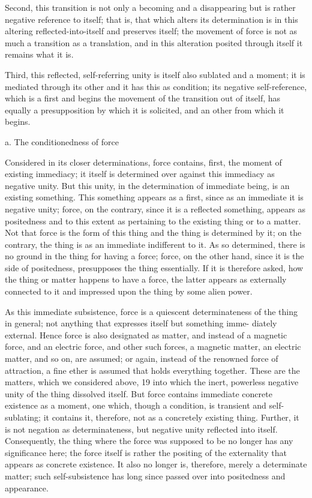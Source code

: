 Second, this transition is not only a becoming and a disappearing
but is rather negative reference to itself;
that is, that which alters its determination is
in this altering reflected-into-itself and preserves itself;
the movement of force is not as much a transition as a translation,
and in this alteration posited through itself it remains what it is.

Third, this reflected, self-referring unity is itself also sublated and a moment;
it is mediated through its other and it has this as condition;
its negative self-reference, which is a first
and begins the movement of the transition out of itself,
has equally a presupposition by which it is solicited,
and an other from which it begins.

a. The conditionedness of force

Considered in its closer determinations, force contains, first, the moment
of existing immediacy; it itself is determined over against this immediacy
as negative unity. But this unity, in the determination of immediate being,
is an existing something. This something appears as a first, since as an
immediate it is negative unity; force, on the contrary, since it is a reflected
something, appears as positedness and to this extent as pertaining to the
existing thing or to a matter. Not that force is the form of this thing and
the thing is determined by it; on the contrary, the thing is as an immediate
indifferent to it.
As so determined, there is no ground in the thing for
having a force; force, on the other hand, since it is the side of positedness,
presupposes the thing essentially. If it is therefore asked, how the thing or
matter happens to have a force, the latter appears as externally connected
to it and impressed upon the thing by some alien power.

As this immediate subsistence, force is a quiescent determinateness of the
thing in general; not anything that expresses itself but something imme-
diately external. Hence force is also designated as matter, and instead of
a magnetic force, and an electric force, and other such forces, a magnetic
matter, an electric matter, and so on, are assumed; or again, instead of the
renowned force of attraction, a fine ether is assumed that holds everything
together.
These are the matters, which we considered above, 19 into which
the inert, powerless negative unity of the thing dissolved itself.
But force contains immediate concrete existence as a moment, one
which, though a condition, is transient and self-sublating; it contains it,
therefore, not as a concretely existing thing. Further, it is not negation as
determinateness, but negative unity reflected into itself. Consequently, the
thing where the force was supposed to be no longer has any significance
here; the force itself is rather the positing of the externality that appears
as concrete existence. It also no longer is, therefore, merely a determinate
matter; such self-subsistence has long since passed over into positedness
and appearance.

